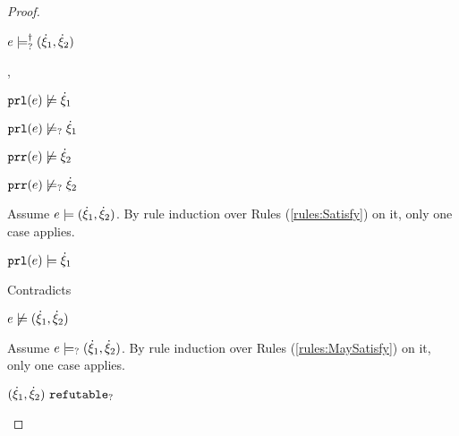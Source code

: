 \begin{proof}
\begin{byCases}
\begin{byCases}
\begin{byCases}
\begin{byCases}
\begin{pfsteps*}
                \item $e \models_{?}^{\dag} (\dot{\xi}_1 , \dot{\xi}_2)$ 
                \end{pfsteps*}
            \end{byCases}
        \item[\cnotsatisfyormay{\hprl{e}}{\hxi_1},\cnotsatisfyormay{\hprr{e}}{\hxi_2}]
            \begin{pfsteps*}
            \item $\mathtt{prl}(e) \not\models \dot{\xi}_1$  
            \item $\mathtt{prl}(e) \not\models_{?} \dot{\xi}_1$  
            \item $\mathtt{prr}(e) \not\models \dot{\xi}_2$  
            \item $\mathtt{prr}(e) \not\models_{?} \dot{\xi}_2$  
            \end{pfsteps*}
            Assume $e \models (\dot{\xi}_1 , \dot{\xi}_2)$. By rule induction over Rules (\ref{rules:Satisfy}) on it, only one case applies.
            \begin{byCases}
            \item[\text{(\ref{rule:CSNotIntroPair})}]
                \begin{pfsteps*}
                \item $\mathtt{prl}(e) \models \dot{\xi}_1$ 
                \end{pfsteps*}
                Contradicts 
            \end{byCases}
            \begin{pfsteps*}
            \item $e \not\models (\dot{\xi}_1 , \dot{\xi}_2)$  
            \end{pfsteps*}
            Assume $e \models_{?} (\dot{\xi}_1 , \dot{\xi}_2)$. By rule induction over Rules (\ref{rules:MaySatisfy}) on it, only one case applies.
            \begin{byCases}
            \item[\text{(\ref{rule:CMSNotIntro})}]
                \begin{pfsteps*}
                \item $(\dot{\xi}_1 , \dot{\xi}_2) ~\mathtt{refutable}_?$  

\end{pfsteps*}
\end{byCases}
\end{byCases}
\end{byCases}
\end{byCases}
\end{proof}
